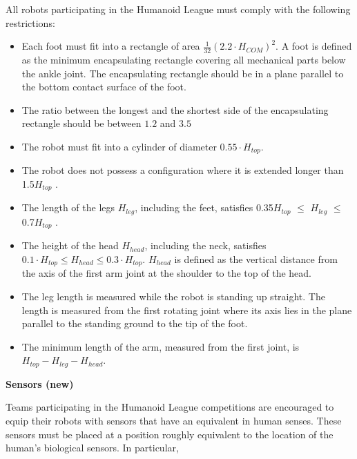 \headlinebox

All robots participating in the Humanoid League must comply with the following restrictions:

\begin{itemize}
\item Each foot must fit into a rectangle of area $\tfrac{1}{32} (2.2 \cdot H_{COM})^2$.
      A foot is defined as the minimum encapsulating rectangle covering all
      mechanical parts below the ankle joint.
      The encapsulating rectangle should be in a plane parallel to the bottom
      contact surface of the foot.
\item The ratio between the longest and the shortest side of the encapsulating
      rectangle should be between $1.2$ and $3.5$
\item The robot must fit into a cylinder of diameter $0.55 \cdot H_{top}$.
\item The robot does not possess a configuration where it is extended longer than 1.5{\textperiodcentered}$H_{top}$ .
\item The length of the legs $H_{leg}$, including the feet, satisfies 0.35{\textperiodcentered}$H_{top}$ ${\leq}$ $H_{leg}$ ${\leq}$ 0.7{\textperiodcentered}$H_{top}$ .
\item The height of the head $H_{head}$, including the neck,
  satisfies $0.1 \cdot H_{top} \leq H_{head} \leq 0.3 \cdot H_{top}$.
  $H_{head}$ is defined as the vertical distance from the axis of the first arm
  joint at the shoulder to the top of the head.
\item The leg length is measured while the robot is standing up straight. The length is measured from the first rotating joint where its axis lies in the plane parallel to the standing ground to the tip of the foot.
\item The minimum length of the arm, measured from the first joint, is $H_{top} - H_{leg} - H_{head}$.
\end{itemize}


{\bfseries Sensors (new)}

\headlinebox

Teams participating in the Humanoid League competitions are encouraged to equip their robots with sensors that have an equivalent in human senses. These sensors must be placed at a position roughly equivalent to the location of the human{\textquoteright}s biological sensors. In particular, 

